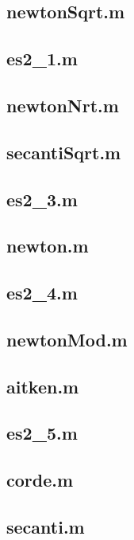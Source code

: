 		\subsection*{newtonSqrt.m} 
		\subsection*{es2\_1.m} 
		\subsection*{newtonNrt.m} 
		\subsection*{secantiSqrt.m} 
		\subsection*{es2\_3.m} 
		\subsection*{newton.m} 
		\subsection*{es2\_4.m} 
		\subsection*{newtonMod.m} 
		\subsection*{aitken.m} 
		\subsection*{es2\_5.m} 
		\subsection*{corde.m} 
		\subsection*{secanti.m} 
